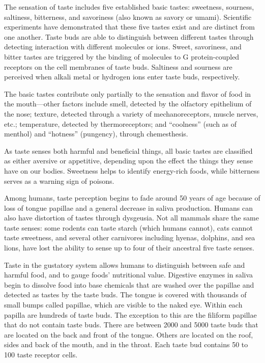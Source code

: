 The sensation of taste includes five established basic tastes: sweetness, sourness, saltiness, bitterness, and savoriness (also known as savory or umami). Scientific experiments have demonstrated that these five tastes exist and are distinct from one another. Taste buds are able to distinguish between different tastes through detecting interaction with different molecules or ions. Sweet, savoriness, and bitter tastes are triggered by the binding of molecules to G protein-coupled receptors on the cell membranes of taste buds. Saltiness and sourness are perceived when alkali metal or hydrogen ions enter taste buds, respectively.

The basic tastes contribute only partially to the sensation and flavor of food in the mouth---other factors include smell, detected by the olfactory epithelium of the nose; texture, detected through a variety of mechanoreceptors, muscle nerves, etc.; temperature, detected by thermoreceptors; and ``coolness'' (such as of menthol) and ``hotness'' (pungency), through chemesthesis.

As taste senses both harmful and beneficial things, all basic tastes are classified as either aversive or appetitive, depending upon the effect the things they sense have on our bodies. Sweetness helps to identify energy-rich foods, while bitterness serves as a warning sign of poisons.

Among humans, taste perception begins to fade around 50 years of age because of loss of tongue papillae and a general decrease in saliva production. Humans can also have distortion of tastes through dysgeusia. Not all mammals share the same taste senses: some rodents can taste starch (which humans cannot), cats cannot taste sweetness, and several other carnivores including hyenas, dolphins, and sea lions, have lost the ability to sense up to four of their ancestral five taste senses.

Taste in the gustatory system allows humans to distinguish between safe and harmful food, and to gauge foods' nutritional value. Digestive enzymes in saliva begin to dissolve food into base chemicals that are washed over the papillae and detected as tastes by the taste buds. The tongue is covered with thousands of small bumps called papillae, which are visible to the naked eye. Within each papilla are hundreds of taste buds. The exception to this are the filiform papillae that do not contain taste buds. There are between 2000 and 5000 taste buds that are located on the back and front of the tongue. Others are located on the roof, sides and back of the mouth, and in the throat. Each taste bud contains 50 to 100 taste receptor cells.


